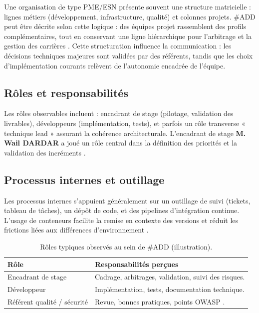 Une organisation de type PME/ESN présente souvent une structure matricielle : lignes métiers (développement, infrastructure, qualité) et colonnes projets. \#ADD peut être décrite selon cette logique : des équipes projet rassemblent des profils complémentaires, tout en conservant une ligne hiérarchique pour l'arbitrage et la gestion des carrières \cite{pressman2014}. Cette structuration influence la communication : les décisions techniques majeures sont validées par des référents, tandis que les choix d'implémentation courants relèvent de l'autonomie encadrée de l'équipe.

\subsection{Rôles et responsabilités}

Les rôles observables incluent : encadrant de stage (pilotage, validation des livrables), développeurs (implémentation, tests), et parfois un rôle transverse « technique lead » assurant la cohérence architecturale. L'encadrant de stage \textbf{M. Wail DARDAR} a joué un rôle central dans la définition des priorités et la validation des incréments \cite{sommerville2016}.

\subsection{Processus internes et outillage}

Les processus internes s'appuient généralement sur un outillage de suivi (tickets, tableau de tâches), un dépôt de code, et des pipelines d'intégration continue. L'usage de conteneurs facilite la remise en contexte des versions et réduit les frictions liées aux différences d'environnement \cite{dockerdoc,twelvefactor}.

\begin{table}[htbp]
  \centering
  \renewcommand{\arraystretch}{1.4}
  \setlength{\tabcolsep}{10pt}
  \caption{Rôles typiques observés au sein de \#ADD (illustration).}
  \label{tab:roles-add}
  \begin{tabular}{|p{3.2cm}|p{9.4cm}|}
    \hline
    \textbf{Rôle} & \textbf{Responsabilités perçues} \\
    \hline
    Encadrant de stage & Cadrage, arbitrages, validation, suivi des risques. \\
    \hline
    Développeur & Implémentation, tests, documentation technique. \\
    \hline
    Référent qualité / sécurité & Revue, bonnes pratiques, points OWASP \cite{owasp2021}. \\
    \hline
  \end{tabular}
\end{table}


